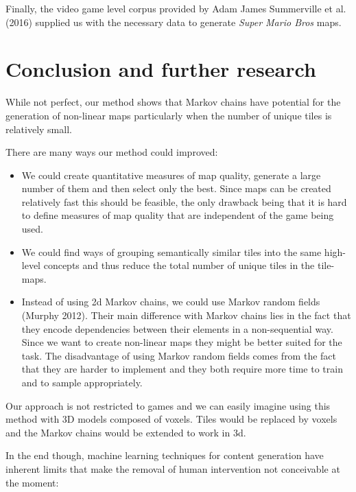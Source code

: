 \documentclass[A4paper,]{article}
\providecommand{\tightlist}{%
  \setlength{\itemsep}{0pt}\setlength{\parskip}{0pt}}
\begin{document}
Finally, the video game level corpus provided by Adam James Summerville
et al. (2016) supplied us with the necessary data to generate
\emph{Super Mario Bros} maps.

\section{Conclusion and further research}\label{sec:conclusion}

While not perfect, our method shows that Markov chains have potential
for the generation of non-linear maps particularly when the number of
unique tiles is relatively small.

There are many ways our method could improved:

\begin{itemize}
\tightlist
\item
  We could create quantitative measures of map quality, generate a large
  number of them and then select only the best. Since maps can be
  created relatively fast this should be feasible, the only drawback
  being that it is hard to define measures of map quality that are
  independent of the game being used.
\item
  We could find ways of grouping semantically similar tiles into the
  same high-level concepts and thus reduce the total number of unique
  tiles in the tile-maps.
\item
  Instead of using 2d Markov chains, we could use Markov random fields
  (Murphy 2012). Their main difference with Markov chains lies in the
  fact that they encode dependencies between their elements in a
  non-sequential way. Since we want to create non-linear maps they might
  be better suited for the task. The disadvantage of using Markov random
  fields comes from the fact that they are harder to implement and they
  both require more time to train and to sample appropriately.
\end{itemize}

Our approach is not restricted to games and we can easily imagine using
this method with 3D models composed of voxels. Tiles would be replaced
by voxels and the Markov chains would be extended to work in 3d.

In the end though, machine learning techniques for content generation
have inherent limits that make the removal of human intervention not
conceivable at the moment:
\end{document}
